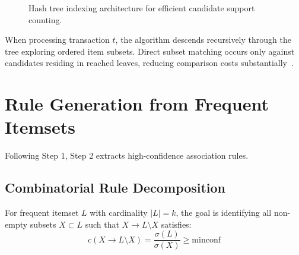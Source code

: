 \begin{figure}[htbp]
{%
}
\caption{Hash tree indexing architecture for efficient candidate support counting.}
\label{fig:dm-hash-tree-architecture-en}
\end{figure}

When processing transaction $t$, the algorithm descends recursively through the tree exploring ordered item subsets. Direct subset matching occurs only against candidates residing in reached leaves, reducing comparison costs substantially~\cite{tan2018}.

\section{Rule Generation from Frequent Itemsets}
\label{sec:dm-rule-generation}

Following Step 1, Step 2 extracts high-confidence association rules.

\subsection{Combinatorial Rule Decomposition}
For frequent itemset $L$ with cardinality $|L| = k$, the goal is identifying all non-empty subsets $X \subset L$ such that $X \rightarrow L \setminus X$ satisfies:
\begin{equation}
c(X \longrightarrow L \setminus X) = \frac{\sigma(L)}{\sigma(X)} \ge \mathrm{minconf}
\end{equation}

